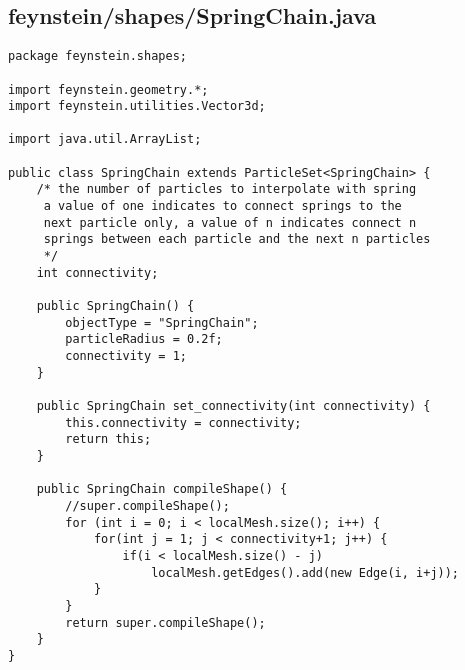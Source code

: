 \subsection*{feynstein/shapes/SpringChain.java}
\begin{lstlisting}
package feynstein.shapes;

import feynstein.geometry.*;
import feynstein.utilities.Vector3d;

import java.util.ArrayList;

public class SpringChain extends ParticleSet<SpringChain> {
	/* the number of particles to interpolate with spring
	 a value of one indicates to connect springs to the
	 next particle only, a value of n indicates connect n
	 springs between each particle and the next n particles
	 */
	int connectivity;
	
	public SpringChain() {
		objectType = "SpringChain";
		particleRadius = 0.2f;
		connectivity = 1;
	}

	public SpringChain set_connectivity(int connectivity) {
		this.connectivity = connectivity;
		return this;
	}
	
    public SpringChain compileShape() {
		//super.compileShape();
		for (int i = 0; i < localMesh.size(); i++) {
			for(int j = 1; j < connectivity+1; j++) {
				if(i < localMesh.size() - j)
					localMesh.getEdges().add(new Edge(i, i+j));
			}
		}
		return super.compileShape();
    }
}\end{lstlisting}

